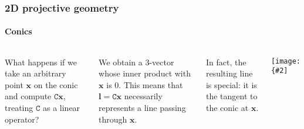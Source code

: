 \documentclass[aspectratio=169]{beamer}
\renewcommand{\vec}[1]{\boldsymbol{#1}}
\newcommand{\mat}[1]{\mathtt{#1}}
\newcommand{\myfig}[3]{\centerline{\texttt{[image: \{\#2]}}}
    \centerline{\scriptsize #3}}
\begin{document}
\begin{frame}
\frametitle{2D projective geometry}
\framesubtitle{Conics}

\begin{columns}

\column{2.2in}

What happens if we take an arbitrary point $\vec{x}$ on the conic and
compute $\mat{C}\vec{x}$, treating $\mat{C}$ as a \alert{linear
  operator}?

\medskip

We obtain a 3-vector whose inner product with $\vec{x}$ is 0.  This
means that $\vec{l}=\mat{C}\vec{x}$ necessarily represents a
\alert{line passing through $\vec{x}$}.

\medskip

In fact, the resulting line is special: it is the \alert{tangent} to
the conic at $\vec{x}$.

\column{2.3in}

\myfig{1.9in}{HZ-fig1-2b}{
  \parbox{2.3in}{
    \begin{center}
      The line $\vec{l}=\mat{C}\vec{x}$ is the tangent to $\mat{C}$
      through $\vec{x}$.\\
      \mbox{\hspace{0.2in}} \\
      Hartley and Zisserman (2004), Fig. 2.2(b) \end{center}}}

\end{columns}

\end{frame}
\end{document}
